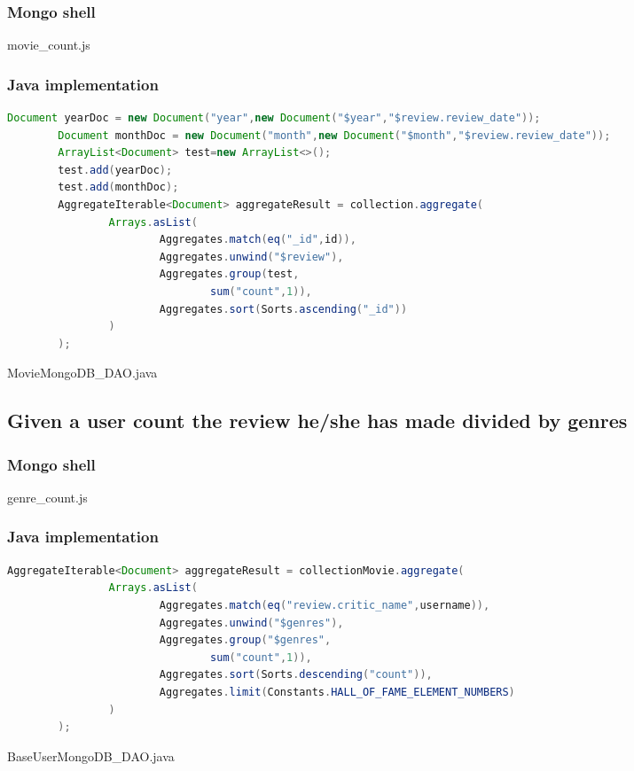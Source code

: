 \subsubsection{Mongo shell}

\caption{movie_count.js}
\subsubsection{Java implementation}
\begin{lstlisting}[language=Java]
Document yearDoc = new Document("year",new Document("$year","$review.review_date"));
        Document monthDoc = new Document("month",new Document("$month","$review.review_date"));
        ArrayList<Document> test=new ArrayList<>();
        test.add(yearDoc);
        test.add(monthDoc);
        AggregateIterable<Document> aggregateResult = collection.aggregate(
                Arrays.asList(
                        Aggregates.match(eq("_id",id)),
                        Aggregates.unwind("$review"),
                        Aggregates.group(test,
                                sum("count",1)),
                        Aggregates.sort(Sorts.ascending("_id"))
                )
        );
\end{lstlisting}
\caption{MovieMongoDB_DAO.java}
\subsection{Given a user count the review he/she has made divided by genres}\label{subsec:preferredGenres}
\subsubsection{Mongo shell}

\caption{genre_count.js}
\subsubsection{Java implementation}
\begin{lstlisting}[language=Java]
AggregateIterable<Document> aggregateResult = collectionMovie.aggregate(
                Arrays.asList(
                        Aggregates.match(eq("review.critic_name",username)),
                        Aggregates.unwind("$genres"),
                        Aggregates.group("$genres",
                                sum("count",1)),
                        Aggregates.sort(Sorts.descending("count")),
                        Aggregates.limit(Constants.HALL_OF_FAME_ELEMENT_NUMBERS)
                )
        );
\end{lstlisting}
\caption{BaseUserMongoDB_DAO.java}
